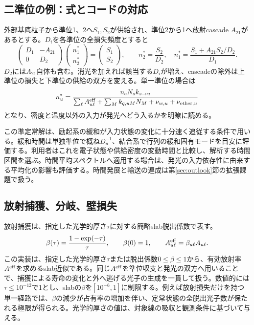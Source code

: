 \subsection{二準位の例：式とコードの対応}
外部基底粒子から準位1、2へ$S_1,S_2$が供給され、準位2から1へ放射cascade $A_{21}$があるとする。$D_i$を各準位の全損失頻度とすると
\begin{equation}
\begin{pmatrix}D_1&-A_{21}\\0&D_2\end{pmatrix}
\begin{pmatrix}n_1^*\\n_2^*\end{pmatrix}
=\begin{pmatrix}S_1\\S_2\end{pmatrix},\qquad
n_2^*=\frac{S_2}{D_2},\quad
n_1^*=\frac{S_1+A_{21}S_2/D_2}{D_1}.
\label{eq:twolevel}
\end{equation}
$D_2$には$A_{21}$自体も含む。消光を加えれば該当する$D_i$が増え、cascadeの除外は上準位の損失と下準位の供給の双方を変える。単一準位の場合は
\begin{equation}
n_u^*=\frac{n_{\mathrm e} N_s k_{s\to u}}
{\sum_\ell A^{\mathrm{eff}}_{u\ell}+\sum_M k_{q,uM}N_M+\nu_{w,u}+\nu_{\mathrm{other},u}}
\label{eq:single}
\end{equation}
となり、密度と温度以外の入力が発光へどう入るかを明瞭に読める。

この準定常解は、励起系の緩和が入力状態の変化に十分速く追従する条件で用いる。緩和時間は単独準位で概ね$D_u^{-1}$、結合系で行列の緩和固有モードを目安に評価する。利用者はこれを電子状態や供給密度の変動時間と比較し、解析する時間区間を選ぶ。時間平均スペクトルへ適用する場合は、発光の入力依存性に由来する平均化の影響も評価する。時間発展と輸送の連成は第\ref{sec:outlook}節の拡張課題で扱う。

\subsection{放射捕獲、分岐、壁損失}
放射捕獲は、指定した光学的厚さ$\tau$に対する簡略slab脱出係数で表す。
\begin{equation}
\beta(\tau)=\frac{1-\exp(-\tau)}{\tau},\qquad \beta(0)=1,\qquad
A^{\mathrm{eff}}_{u\ell}=\beta_{u\ell}A_{u\ell}.
\label{eq:escape}
\end{equation}
この実装は、指定した光学的厚さ$\tau$または脱出係数$0\leq\beta\leq1$から、有効放射率$A^{\mathrm{eff}}$を求めるslab近似である。同じ$A^{\mathrm{eff}}$を準位収支と発光の双方へ用いることで、捕獲による寿命の変化と外へ逃げる光子の生成を一貫して扱う。数値的には$\tau\leq10^{-12}$で1とし、slabの$\beta$を$[10^{-6},1]$に制限する。例えば放射損失だけを持つ単一経路では、$\beta$の減少が占有率の増加を伴い、定常状態の全脱出光子数が保たれる極限が得られる。光学的厚さの値は、対象線の吸収と観測条件に基づいて与える。

